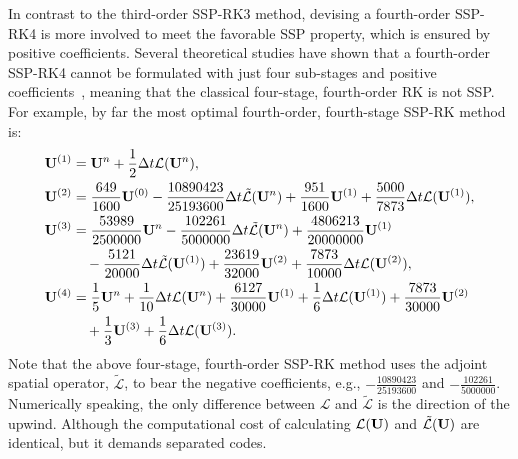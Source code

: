 In contrast to the third-order SSP-RK3 method, devising a fourth-order SSP-RK4
is more involved to meet the favorable SSP property, which is ensured by positive coefficients.
Several theoretical studies have shown that a fourth-order SSP-RK4
cannot be formulated with just four sub-stages and positive coefficients~\cite{gottlieb1998total},
meaning that the classical four-stage, fourth-order RK is not SSP\@.
For example, by far the most optimal fourth-order, fourth-stage SSP-RK method is:
\begin{equation}\label{eq:ssp_rk44_negatives}
    \begin{split}
        \mathbf{U}^{(1)} &= \mathbf{U}^{n} + \frac{1}{2} \Delta t \mathcal{L}(\mathbf{U}^{n}), \\
        \mathbf{U}^{(2)} &= \frac{649}{1600} \mathbf{U}^{(0)} - \frac{10890423}{25193600} \Delta t \tilde{\mathcal{L}} (\mathbf{U}^{n}) + \frac{951}{1600} \mathbf{U}^{(1)} + \frac{5000}{7873} \Delta t \mathcal{L}(\mathbf{U}^{(1)}), \\
        \mathbf{U}^{(3)} &= \frac{53989}{2500000} \mathbf{U}^{n} - \frac{102261}{5000000} \Delta t \tilde{\mathcal{L}} (\mathbf{U}^{n}) + \frac{4806213}{20000000} \mathbf{U}^{(1)} \\
            &\quad - \frac{5121}{20000} \Delta t \tilde{\mathcal{L}}(\mathbf{U}^{(1)}) + \frac{23619}{32000} \mathbf{U}^{(2)} + \frac{7873}{10000} \Delta t \mathcal{L}(\mathbf{U}^{(2)}), \\
        \mathbf{U}^{(4)} &= \frac{1}{5} \mathbf{U}^{n} + \frac{1}{10} \Delta t \mathcal{L}(\mathbf{U}^{n}) + \frac{6127}{30000} \mathbf{U}^{(1)} + \frac{1}{6} \Delta t \mathcal{L}(\mathbf{U}^{(1)}) + \frac{7873}{30000} \mathbf{U}^{(2)} \\
            &\quad + \frac{1}{3} \mathbf{U}^{(3)} + \frac{1}{6} \Delta t \mathcal{L}(\mathbf{U}^{(3)}).
    \end{split}
\end{equation}
Note that the above four-stage, fourth-order SSP-RK method uses the adjoint spatial operator, \( \tilde{\mathcal{L}} \),
to bear the negative coefficients, e.g., \( -\frac{10890423}{25193600} \) and \( -\frac{102261}{5000000} \).
Numerically speaking, the only difference between \( \mathcal{L} \) and \( \tilde{\mathcal{L}} \)
is the direction of the upwind. Although the computational cost of calculating \( \mathcal{L}(\mathbf{U}) \) and
\( \tilde{\mathcal{L}}(\mathbf{U}) \) are identical, but it demands separated codes.

